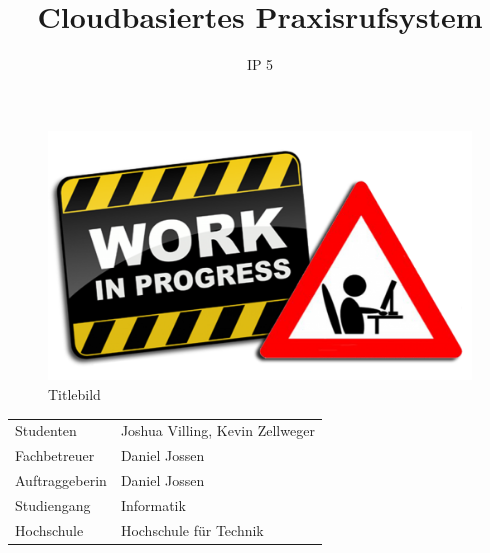 \documentclass[final]{fhnwreport}
\title{Cloudbasiertes Praxisrufsystem}  %
\author{IP 5}                      %
\begin{document}
    \maketitle
    \begin{figure}[h]\label{fig:title}
        \includegraphics[width=\linewidth]{graphics/wip}\caption[Titlebild]{Titlebild}
    \end{figure}

    \begin{center}
        \renewcommand\arraystretch{2}
        \begin{tabular}{l l}
            Studenten & Joshua Villing, Kevin Zellweger\\
            Fachbetreuer & Daniel Jossen\\
            Auftraggeberin & Daniel Jossen\\
            Studiengang & Informatik\\
            Hochschule & Hochschule für Technik
        \end{tabular}
    \end{center}

    \clearpage


    \thispagestyle{empty}
    

    \tableofcontents
    \clearpage

    
    
    
    
    
    
    


    
\end{document}
